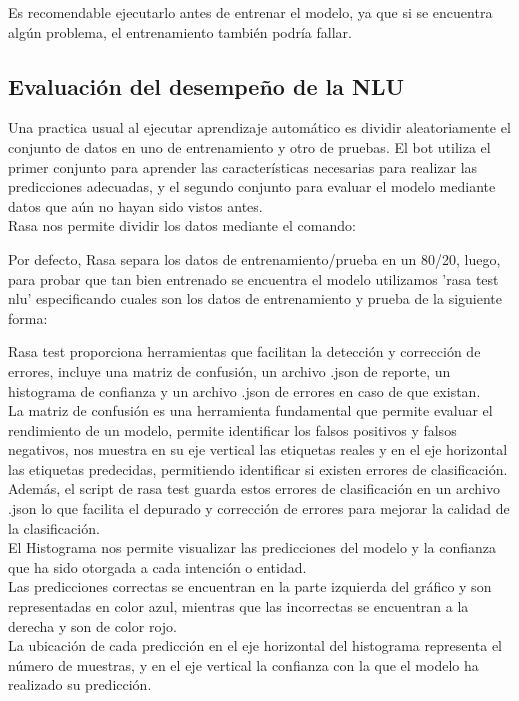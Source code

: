 \begin{center}
\end{center}

Es recomendable ejecutarlo antes de entrenar el modelo, ya que si se encuentra algún problema, el
entrenamiento también podría fallar.

\subsection{Evaluación del desempeño de la NLU}
Una practica usual al ejecutar aprendizaje automático es dividir aleatoriamente el conjunto de
datos en uno de entrenamiento y otro de pruebas. El bot utiliza el primer conjunto para aprender
las características necesarias para realizar las predicciones adecuadas, y el segundo conjunto para
evaluar el modelo mediante datos que aún no hayan sido vistos antes.\\
Rasa nos permite dividir los datos mediante el comando:

\begin{center}
\end{center}

Por defecto, Rasa separa los datos de entrenamiento/prueba en un 80/20, luego, para probar que tan
bien entrenado se encuentra el modelo utilizamos 'rasa test nlu' especificando cuales son los datos
de entrenamiento y prueba de la siguiente forma:\\

\begin{center}
\end{center}

Rasa test proporciona herramientas que facilitan la detección y corrección de errores, incluye una
matriz de confusión, un archivo .json de reporte, un histograma de confianza y un archivo .json de
errores en caso de que existan.\\
La matriz de confusión es una herramienta fundamental que permite evaluar el rendimiento de un
modelo, permite identificar los falsos positivos y falsos negativos, nos muestra en su eje vertical
las etiquetas reales y en el eje horizontal las etiquetas predecidas, permitiendo identificar si
existen errores de clasificación.\\
Además, el script de rasa test guarda estos errores de clasificación en un archivo .json lo que
facilita el depurado y corrección de errores para mejorar la calidad de la clasificación.\\
El Histograma nos permite visualizar las predicciones del modelo y la confianza que ha sido
otorgada a cada intención o entidad.\\
Las predicciones correctas se encuentran en la parte izquierda del gráfico y son representadas en
color azul, mientras que las incorrectas se encuentran a la derecha y son de color rojo.\\
La ubicación de cada predicción en el eje horizontal del histograma representa el número de
muestras, y en el eje vertical la confianza con la que el modelo ha realizado su
predicción. \cite{interpretacion_graficos}

